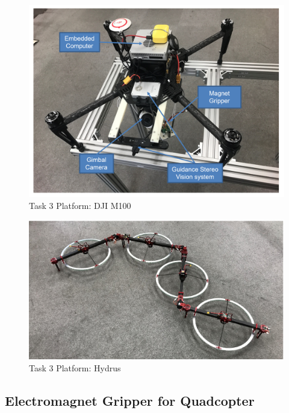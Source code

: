 \documentclass{standalone}
\begin{document}
 \begin{figure}%
    \begin{center}
    \includegraphics[keepaspectratio=true, width=1\linewidth, height=0.3\textheight]
    {sections//task3//images//task3platform.png}
      \end{center}
    \caption{Task 3 Platform: DJI M100}
    \label{task3platform-m100}
    \end{figure}
 \begin{figure}%
    \begin{center}
      \includegraphics[clip, bb= 0 0 650 350, width=\columnwidth]{sections/task3/images/task3platform-hydrus.eps}
      \end{center}
    \caption{Task 3 Platform: Hydrus}
    \label{task3platform-hydrus}
    \end{figure}
    
    
\subsection{Electromagnet Gripper for Quadcopter}
\end{document}
